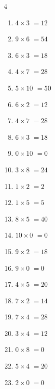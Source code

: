 \begin{multicols}{4}
\begin{enumerate}
  \item $4\times 3$
        $=12$

  \item $9\times 6$
        $=54$

  \item $6\times 3$
        $=18$

  \item $4\times 7$
        $=28$

  \item $5\times 10$
        $=50$

  \item $6\times 2$
        $=12$

  \item $4\times 7$
        $=28$

  \item $6\times 3$
        $=18$

  \item $0\times 10$
        $=0$

  \item $3\times 8$
        $=24$

  \item $1\times 2$
        $=2$

\columnbreak %

  \item $1\times 5$
        $=5$

  \item $8\times 5$
        $=40$

  \item $10\times 0$
        $=0$

  \item $9\times 2$
        $=18$

  \item $9\times 0$
        $=0$

  \item $4\times 5$
        $=20$

  \item $7\times 2$
        $=14$

  \item $7\times 4$
        $=28$

  \item $3\times 4$
        $=12$

  \item $0\times 8$
        $=0$

  \item $5\times 4$
        $=20$

  \item $2\times 0$
        $=0$


\end{enumerate}
\end{multicols}
